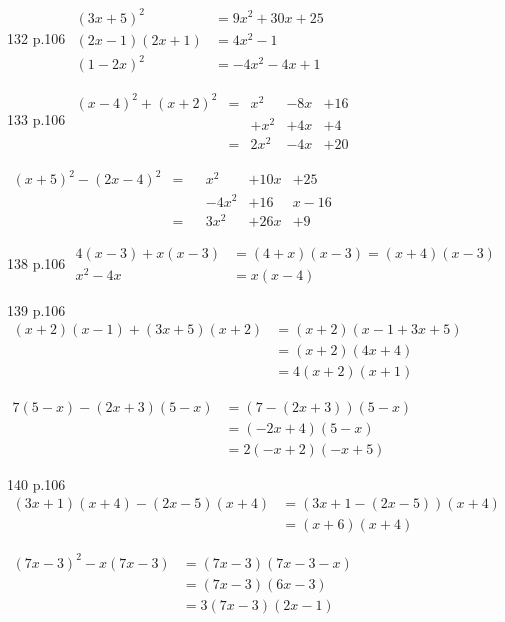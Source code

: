 \documentclass[10pt,a4paper,openany,twoside]{book}
\begin{document}
\begin{bookexo}{132 p.106}
$\begin{aligned}
    (3x+5)^2 &= 9x^2+30x+25 \\
    (2x-1)(2x+1) &= 4x^2-1 \\
    (1-2x)^2 &= -4x^2-4x+1
\end{aligned}$
\end{bookexo}

\begin{bookexo}{133 p.106}
$\begin{aligned}
    (x-4)^2+(x+2)^2
        &=&x^2&-8x&+16\\
        & &+x^2&+4x&+4\\
        &=&2x^2&-4x&+20
\end{aligned}$

$\begin{aligned}
    (x+5)^2-(2x-4)^2
        &=& &x^2&+10x&+25\\
        &&  &-4x^2&+16&x-16\\
        &=& &3x^2&+26x&+9
\end{aligned}$
\end{bookexo}

\begin{bookexo}{138 p.106}
$\begin{aligned}
4(x-3)+x(x-3)&=(4+x)(x-3)=(x+4)(x-3) \\
x^2-4x &= x(x-4)
\end{aligned}$
\end{bookexo}

\begin{bookexo}{139 p.106}
$\begin{aligned}
    (x+2)(x-1)+(3x+5)(x+2)
        &= (x+2)(x-1+3x+5)\\
        &= (x+2)(4x+4)\\
        &= 4(x+2)(x+1)
\end{aligned}$

$\begin{aligned}
    7(5-x)-(2x+3)(5-x)
        &= (7-(2x+3))(5-x) \\
        &= (-2x+4)(5-x) \\
        &= 2(-x+2)(-x+5)
\end{aligned}$
\end{bookexo}

\begin{bookexo}{140 p.106}
$\begin{aligned}
    (3x+1)(x+4)-(2x-5)(x+4)
        &= (3x+1-(2x-5))(x+4) \\
        &= (x+6)(x+4)
\end{aligned}$

$\begin{aligned}
    (7x-3)^2-x(7x-3)
        &= (7x-3)(7x-3-x) \\
        &= (7x-3)(6x-3)\\
        &= 3(7x-3)(2x-1)
\end{aligned}$
\end{bookexo}
\end{document}
